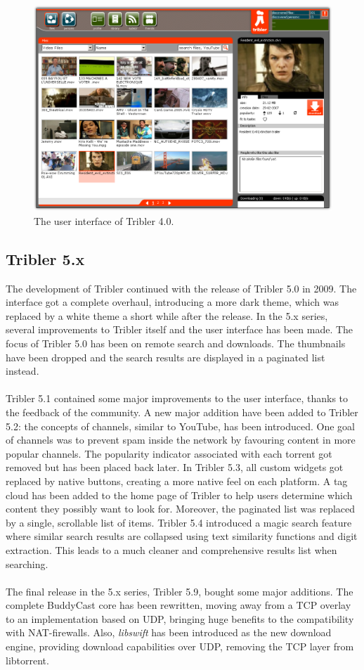 \begin{figure}[t]
	\centering
	\includegraphics[width=0.8\columnwidth]{images/tribler4}
	\caption{The user interface of Tribler 4.0.}
	\label{fig:tribler4}
\end{figure}

\subsection{Tribler 5.x}
The development of Tribler continued with the release of Tribler 5.0 in 2009\cite{historyoftribler}.  The interface got a complete overhaul, introducing a more dark theme, which was replaced by a white theme a short while after the release. In the 5.x series, several improvements to Tribler itself and the user interface has been made. The focus of Tribler 5.0 has been on remote search and downloads. The thumbnails have been dropped and the search results are displayed in a paginated list instead.\\\\
Tribler 5.1 contained some major improvements to the user interface, thanks to the feedback of the community. A new major addition have been added to Tribler 5.2: the concepts of channels, similar to YouTube, has been introduced. One goal of channels was to prevent spam inside the network by favouring content in more popular channels. The popularity indicator associated with each torrent got removed but has been placed back later. In Tribler 5.3, all custom widgets got replaced by native buttons, creating a more native feel on each platform. A tag cloud has been added to the home page of Tribler to help users determine which content they possibly want to look for. Moreover, the paginated list was replaced by a single, scrollable list of items. Tribler 5.4 introduced a magic search feature where similar search results are collapsed using text similarity functions and digit extraction. This leads to a much cleaner and comprehensive results list when searching.\\\\
The final release in the 5.x series, Tribler 5.9, bought some major additions. The complete BuddyCast core has been rewritten, moving away from a TCP overlay to an implementation based on UDP, bringing huge benefits to the compatibility with NAT-firewalls. Also, \emph{libswift} has been introduced as the new download engine, providing download capabilities over UDP, removing the TCP layer from libtorrent.


